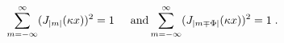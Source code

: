 \begin{equation}
\sum\limits_{m=-\infty}^\infty(J_{|m|}(\kappa x))^2=1 \hspace{0.5cm} \mbox{and}
\sum\limits_{m=-\infty}^\infty(J_{|m\mp\Phi|}(\kappa x))^2=1 \;.
\end{equation}

